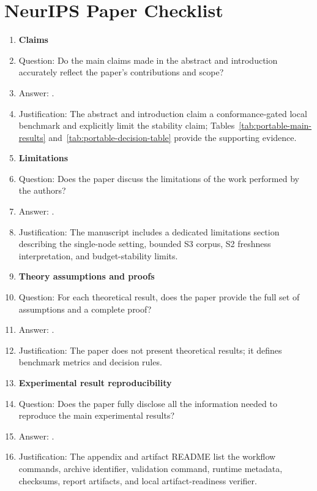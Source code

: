 \section*{NeurIPS Paper Checklist}

\begin{enumerate}

\item {\bf Claims}
    \item[] Question: Do the main claims made in the abstract and introduction accurately reflect the paper's contributions and scope?
    \item[] Answer: \answerYes{}.
    \item[] Justification: The abstract and introduction claim a conformance-gated local benchmark and explicitly limit the stability claim; Tables~\ref{tab:portable-main-results} and~\ref{tab:portable-decision-table} provide the supporting evidence.

\item {\bf Limitations}
    \item[] Question: Does the paper discuss the limitations of the work performed by the authors?
    \item[] Answer: \answerYes{}.
    \item[] Justification: The manuscript includes a dedicated limitations section describing the single-node setting, bounded S3 corpus, S2 freshness interpretation, and budget-stability limits.

\item {\bf Theory assumptions and proofs}
    \item[] Question: For each theoretical result, does the paper provide the full set of assumptions and a complete proof?
    \item[] Answer: \answerNA{}.
    \item[] Justification: The paper does not present theoretical results; it defines benchmark metrics and decision rules.

\item {\bf Experimental result reproducibility}
    \item[] Question: Does the paper fully disclose all the information needed to reproduce the main experimental results?
    \item[] Answer: \answerYes{}.
    \item[] Justification: The appendix and artifact README list the workflow commands, archive identifier, validation command, runtime metadata, checksums, report artifacts, and local artifact-readiness verifier.


\end{enumerate}
